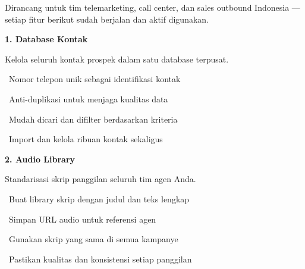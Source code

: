 \documentclass[a4paper]{article}
\begin{document}
{\fontsize{9.5}{13}\selectfont\color{TextLight}
Dirancang untuk tim telemarketing, call center, dan sales outbound Indonesia --- setiap fitur berikut sudah berjalan dan aktif digunakan.}

\vspace{6pt}

\noindent
\begin{minipage}[t]{0.485\textwidth}
    \colorbox{CrimsonPrimary}{%
        \begin{minipage}{\dimexpr\textwidth-14pt}
            \vspace{5pt}
            {\fontsize{10}{13}\selectfont\bfseries\color{White} 1. Database Kontak}
            \vspace{5pt}
        \end{minipage}}
    \vspace{5pt}
    {\fontsize{9}{12}\selectfont\color{TextDark}%
    Kelola seluruh kontak prospek dalam satu database terpusat.\par\vspace{3pt}
    \textbullet\ Nomor telepon unik sebagai identifikasi kontak\par\vspace{2pt}%
    \textbullet\ Anti-duplikasi untuk menjaga kualitas data\par\vspace{2pt}%
    \textbullet\ Mudah dicari dan difilter berdasarkan kriteria\par\vspace{2pt}%
    \textbullet\ Import dan kelola ribuan kontak sekaligus}%
\end{minipage}%
\hfill
\begin{minipage}[t]{0.485\textwidth}
    \colorbox{BluePrimary}{%
        \begin{minipage}{\dimexpr\textwidth-14pt}
            \vspace{5pt}
            {\fontsize{10}{13}\selectfont\bfseries\color{White} 2. Audio Library}
            \vspace{5pt}
        \end{minipage}}
    \vspace{5pt}
    {\fontsize{9}{12}\selectfont\color{TextDark}%
    Standarisasi skrip panggilan seluruh tim agen Anda.\par\vspace{3pt}
    \textbullet\ Buat library skrip dengan judul dan teks lengkap\par\vspace{2pt}%
    \textbullet\ Simpan URL audio untuk referensi agen\par\vspace{2pt}%
    \textbullet\ Gunakan skrip yang sama di semua kampanye\par\vspace{2pt}%
    \textbullet\ Pastikan kualitas dan konsistensi setiap panggilan}%
\end{minipage}
\end{document}
